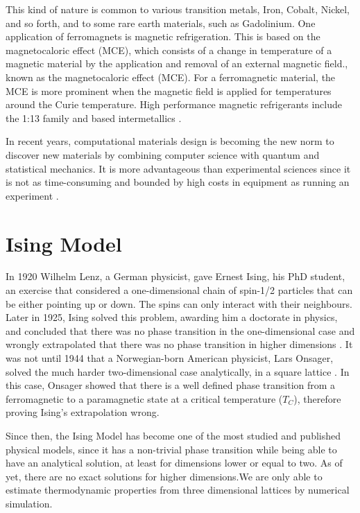 This kind of nature is common to various transition metals, Iron, Cobalt, Nickel, and so forth, and to some rare earth materials, such as Gadolinium.
One application of ferromagnets is magnetic refrigeration. This is based on the magnetocaloric effect (MCE), which consists of a change in temperature of a magnetic material by the application and removal of an external magnetic field., known as the magnetocaloric effect (MCE). For a ferromagnetic material, the MCE is more prominent when the magnetic field is applied for temperatures around the Curie temperature. 
High performance magnetic refrigerants include the  1:13 family \cite{Fujita} and  based intermetallics \cite{Bruck}. 

In recent years, computational materials design is becoming the new norm to discover new materials by combining computer science with quantum and statistical mechanics. It is more advantageous than experimental sciences since it is not as time-consuming and bounded by high costs in equipment as running an experiment \cite{Curtarolo2013,Chen2019, Sanvito2017}.

\section{Ising Model}

In 1920 Wilhelm Lenz, a German physicist, gave Ernest Ising, his PhD student, an exercise that considered a one-dimensional chain of spin-1/2 particles that can be either pointing up or down. The spins can only interact with their neighbours. Later in 1925, Ising solved this problem, awarding him a doctorate in physics,  and concluded that there was no phase transition in the one-dimensional case and wrongly extrapolated that there was no phase transition in higher dimensions \cite{Ising1925}. It was not until 1944 that a Norwegian-born American physicist, Lars Onsager, solved the much harder two-dimensional case analytically, in a square lattice \cite{Onsager1944}. In this case, Onsager showed that there is a well defined phase transition from a ferromagnetic to a paramagnetic state at a critical temperature ($T_C$), therefore proving Ising's extrapolation wrong.

Since then, the Ising Model has become one of the most studied and published physical models, since it has a non-trivial phase transition while being able to have an analytical solution, at least for dimensions lower or equal to two. As of yet, there are no exact solutions for higher dimensions.We are only able to estimate thermodynamic properties from three dimensional lattices by numerical simulation.

